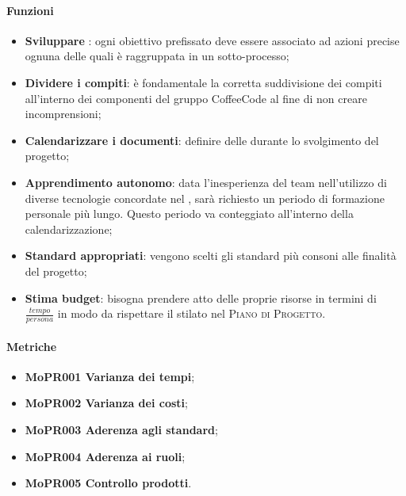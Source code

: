 \documentclass[../piano-di-qualifica.tex]{subfiles}
\begin{document}
\paragraph{Funzioni}
\label{sub:funzioni_1}

\begin{itemize}
    \item \textbf{Sviluppare }: ogni obiettivo prefissato deve essere associato ad azioni precise ognuna delle quali è raggruppata in un sotto-processo;
    \item \textbf{Dividere i compiti}: è fondamentale la corretta suddivisione dei compiti all'interno dei componenti del gruppo CoffeeCode al fine di non creare incomprensioni;
    \item \textbf{Calendarizzare i documenti}: definire delle  durante lo svolgimento del progetto;
    \item \textbf{Apprendimento autonomo}: data l'inesperienza del team nell'utilizzo di diverse tecnologie concordate nel , sarà richiesto un periodo di formazione personale più lungo. Questo periodo va conteggiato all'interno della calendarizzazione;
    \item \textbf{Standard appropriati}: vengono scelti gli standard più consoni alle finalità del progetto;
    \item \textbf{Stima budget}: bisogna prendere atto delle proprie risorse in termini di $\frac{tempo}{persona}$ in modo da rispettare il  stilato nel \textsc{Piano di Progetto}.
\end{itemize}

\paragraph{Metriche}
\label{sub:metriche_1}
\begin{itemize}
    \item \textbf{MoPR001 Varianza dei tempi};
    \item \textbf{MoPR002 Varianza dei costi};
    \item \textbf{MoPR003 Aderenza agli standard};
    \item \textbf{MoPR004 Aderenza ai ruoli};
    \item \textbf{MoPR005 Controllo prodotti}.
\end{itemize}
\end{document}
